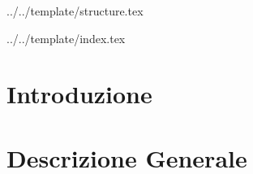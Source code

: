 


\def\DOCUMENTO{Analisi dei Requisiti}
\def\VERSIONE{1.0.0}

\def\DESCRIZIONE{Documento che descrive l'analisi dei requisiti e dei casi d'uso del gruppo \GRUPPO per il progetto \PROGETTO}

\def\REDATTORE {Matteo Agostinetto \\ & Nicola Carraro}
\def\VERIFICATORE {<Verificatore>}
\def\RESPONSABILE {Valerio Burlin}

\def\USO {Esterno}

\def\DISTRIBUZIONE {\GRUPPO{}\\ & \COMMITTENTE{}\\}

\def\DESCRIZIONE {Documento che descrive l'analisi dei requisiti e dei casi d'uso del gruppo \GRUPPO per il progetto \PROGETTO}


\def\INDICE	{true}
\def\TABELLE {true}
\def\FIGURE {true}


 {../../template/structure.tex}


 {../../template/index.tex}



%


\section{Introduzione}

\newpage

\section{Descrizione Generale}

\newpage





